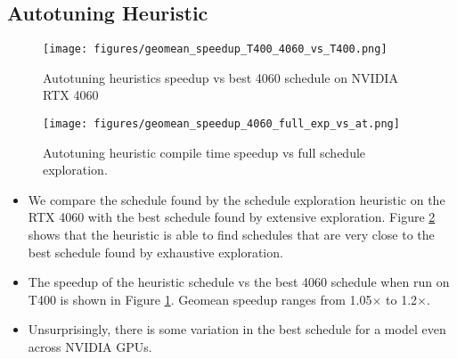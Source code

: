 
\subsection{Autotuning Heuristic}
\begin{figure}[htb]
  \centering
  \texttt{[image: figures/geomean\_speedup\_T400\_4060\_vs\_T400.png]}
  \caption{Autotuning heuristics speedup vs best 4060 schedule on NVIDIA RTX 4060}
  \label{Fig:AutotuningSpeedupvs4060Sched}
\end{figure}


\begin{figure}[htb]
  \centering
  \texttt{[image: figures/geomean\_speedup\_4060\_full\_exp\_vs\_at.png]}
  \caption{Autotuning heuristic compile time speedup vs full schedule exploration.}
  \label{Fig:HeuristicVsFullExplore_Speedup}
\end{figure}

\begin{itemize}
  \item We compare the schedule found by the schedule exploration heuristic on the RTX 4060 with the best schedule found by
  extensive exploration. Figure \ref{Fig:HeuristicVsFullExplore_Speedup} shows that the heuristic is able to find schedules that are
  very close to the best schedule found by exhaustive exploration.
  \item The speedup of the heuristic schedule vs the best 4060 schedule when run on T400 is shown in Figure \ref{Fig:AutotuningSpeedupvs4060Sched}.
  Geomean speedup ranges from 1.05$\times$ to 1.2$\times$. 
  \item Unsurprisingly, there is some variation in the best schedule for a model even across NVIDIA GPUs.
\end{itemize}

